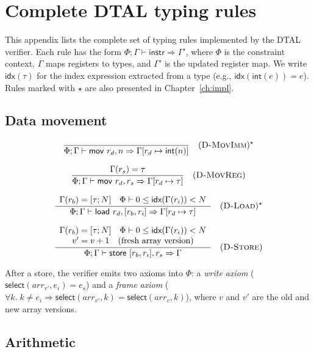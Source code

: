 \chapter{Complete DTAL typing rules}\label{app:dtal-rules}

This appendix lists the complete set of typing rules implemented by the DTAL verifier. Each rule has the form $\Phi; \Gamma \vdash \textsf{instr} \Rightarrow \Gamma'$, where $\Phi$ is the constraint context, $\Gamma$ maps registers to types, and $\Gamma'$ is the updated register map. We write $\textsf{idx}(\tau)$ for the index expression extracted from a type (e.g., $\textsf{idx}(\textsf{int}(e)) = e$). Rules marked with $\star$ are also presented in Chapter~\ref{ch:impl}.

\section*{Data movement}

$$
  \frac{}{\Phi; \Gamma \vdash \textsf{mov } r_d, n \Rightarrow \Gamma[r_d \mapsto \textsf{int}(n)]} \quad (\textsc{D-MovImm})^\star
$$

$$
  \frac{\Gamma(r_s) = \tau}{\Phi; \Gamma \vdash \textsf{mov } r_d, r_s \Rightarrow \Gamma[r_d \mapsto \tau]} \quad (\textsc{D-MovReg})
$$

$$
  \frac{
    \begin{array}{c}
      \Gamma(r_b) = [\tau; N] \quad \Phi \vdash 0 \le \textsf{idx}(\Gamma(r_i)) < N
    \end{array}
  }{\Phi; \Gamma \vdash \textsf{load } r_d, [r_b, r_i] \Rightarrow \Gamma[r_d \mapsto \tau]} \quad (\textsc{D-Load})^\star
$$

$$
  \frac{
    \begin{array}{c}
      \Gamma(r_b) = [\tau; N] \quad \Phi \vdash 0 \le \textsf{idx}(\Gamma(r_i)) < N \\
      v' = v + 1 \quad \text{(fresh array version)}
    \end{array}
  }{\Phi; \Gamma \vdash \textsf{store } [r_b, r_i], r_s \Rightarrow \Gamma} \quad (\textsc{D-Store})
$$

\noindent After a store, the verifier emits two axioms into $\Phi$: a \textit{write axiom} ($\textsf{select}(\mathit{arr}_{v'}, e_i) = e_s$) and a \textit{frame axiom} ($\forall k.\; k \ne e_i \Rightarrow \textsf{select}(\mathit{arr}_{v'}, k) = \textsf{select}(\mathit{arr}_v, k)$), where $v$ and $v'$ are the old and new array versions.

\section*{Arithmetic}

